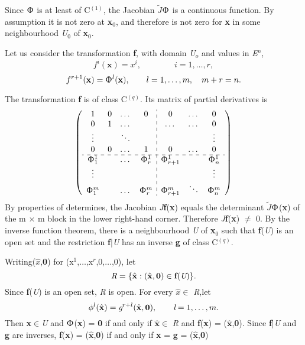 \documentclass{article}
\theoremstyle{nonumberplain}
\newtheorem{Proof}{\hskip 2em Proof}
\begin{document}
\begin{Proof}
Since $\Upphi$ is at least of C$^{(1)}$, the Jacobian $\tilde{J}$\textbf{$\Upphi$}  
is a continuous function. By assumption it is not zero at \textbf{x}$_0$, and therefore is not zero for \textbf{x} in some neighbourhood \emph{U}$_0$ of \textbf{x}$_0$. 

Let us consider the transformation \textbf{f}, with domain \emph{U}$_o$ and values in \emph{E$^n$},
$$f^i(\textbf{x}) = x^i,\qquad\qquad i= 1,\dotsc,r,$$
$$f^{r+1}(\textbf{x}) = \Upphi^l(\textbf{x}),\qquad l = 1,\dotsc,m,\quad m + r = n.$$

The transformation \textbf{f} is of class C$^{(q)}$. Its matrix of partial derivatives is
$$\begin{pmatrix}
\begin{array}{cccc:ccc}
1&0&\dotsc&0&0&\dotsc&0\\
0&1&\dotsc& &\dotsc&\dotsc&0\\
\vdots& &\ddots& & & &\vdots\\ 
0&0&\dotsc&1&0&\dotsc&0\\ \hdashline
\Upphi^1_1& &\dotsc&\Upphi^1_r&\Upphi^1_{r+1}& &\Upphi^1_n\\
\vdots& & & & & &\vdots\\
\Upphi^m_1& &\dotsc&\Upphi^m_r&\Upphi^m_{r+1} &\ddots&\Upphi^m_n\\
\end{array}
\end{pmatrix}$$
By properties of determines, the Jacobian \emph{J}\textbf{f}(\textbf{x}) equals the determinant \emph{$\tilde{J}$}\textbf{$\Upphi$}(\textbf{x}) of the m $\times$ m block in the lower right-hand corner. Therefore \emph{J}\textbf{f}(\textbf{x}) $\neq$ 0. By the inverse function theorem, there is a neighbourhood \emph{U} of \textbf{x}$_0$ such that \textbf{f}(\emph{U}) is an open set and the restriction \textbf{f}|\emph{U} has an inverse \textbf{g} of class C$^{(q)}$.\par
Writing(\textbf{$\hat{x}$},\textbf{0}) for (x$^1$,$\dotsc$,x$^r$,0,$\dotsc$,0), let
$$\emph{R} = \{\hat{\textbf{x}}:
(
\hat{\textbf{x}},
\textbf{0})\in\textbf{f}(\emph{U}   )\}.$$
Since \textbf{f}(\emph{U}) is an open set, \emph{R} is open. For every $\hat{x} \in$ \emph{R},let
$$ \phi^l(\hat{\textbf{x}}) = \emph{g}^{r+l}(\hat{\textbf{x}},\textbf{0})
,\qquad \emph{l} = 1,\dotsc,m. 
$$
Then \textbf{x}$\in$\emph{U} and \textbf{$\Upphi$}(\textbf{x}) = \textbf{0} if and only if $\hat{\textbf{x}} \in$ \emph{R} and \textbf{f}(\textbf{x}) = ($\hat{\textbf{x}}$,\textbf{0}). Since \textbf{f}|\emph{U} and \textbf{g} are inverses, \textbf{f}(\textbf{x}) = ($\hat{\textbf{x}}$,\textbf{0}) if and only if \textbf{x} = \textbf{g} = ($\hat{\textbf{x}}$,\textbf{0})
\end{Proof}
\end{document}
